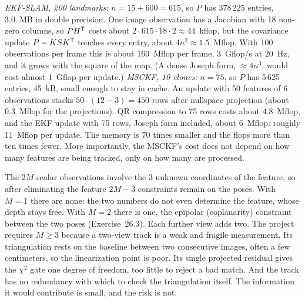 \begin{solutions}
  \item \emph{EKF-SLAM, 200 landmarks:} $n = 15 + 600 = 615$, so $P$ has $378\,225$ entries, 3.0~MB in double precision. One image observation has a Jacobian with 18
        non-zero columns, so $PH^{\mathsf{T}}$ costs about $2\cdot615\cdot18\cdot2 \approx 44$~kflop, but the covariance update $P - KSK^{\mathsf{T}}$ touches every entry, about $4n^2 \approx 1.5$~Mflop. With 100
        observations per frame this is about 160~Mflop per frame, 3~Gflop/s at 20~Hz, and it grows with the square of the map. (A dense Joseph form, $\approx 4n^3$, would cost
        almost 1~Gflop per update.) \emph{MSCKF, 10 clones:} $n = 75$, so $P$ has 5\,625 entries, 45~kB, small enough to stay in cache. An update with 50 features of 6
        observations stacks $50\cdot(12 - 3) = 450$ rows after nullspace projection (about $0.3$~Mflop for the projections). QR compression to 75 rows costs about $4.8$~Mflop,
        and the EKF update with 75 rows, Joseph form included, about 6~Mflop: roughly 11~Mflop per update. The memory is 70 times smaller and the flops more
        than ten times fewer. More importantly, the MSCKF's cost does not depend on how many features are being tracked, only on how many are processed.

  \item The $2M$ scalar observations involve the 3 unknown coordinates of the feature, so after eliminating the feature $2M - 3$ constraints remain on the poses.
        With $M = 1$ there are none: the two numbers do not even determine the feature, whose depth stays free. With $M = 2$ there is one, the epipolar
        (coplanarity) constraint between the two poses (Exercise~26.3). Each further view adds two. The project requires $M \ge 3$ because a two-view track is a weak and
        fragile measurement. Its triangulation rests on the baseline between two consecutive images, often a few centimeters, so the linearization point
        is poor. Its single projected residual gives the $\chi^2$ gate one degree of freedom, too little to reject a bad match. And the track has no redundancy
        with which to check the triangulation itself. The information it would contribute is small, and the risk is not.


\end{solutions}
